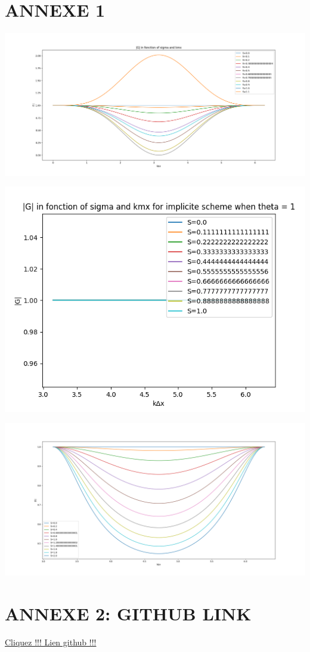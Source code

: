 \documentclass[12pt]{article}
\begin{document}





\newpage

\section{ANNEXE 1}





\vfill
\includegraphics[width=1\textwidth]{sigma_question d.png}
\vfill

\vfill
\includegraphics[width=1\textwidth]{sigma_f_1.png}
\vfill

\vfill
\includegraphics[width=1\textwidth]{sigma_f_05.png}
\vfill

\section{ANNEXE 2: GITHUB LINK}

\href{https://github.com/Kenesis69/MEC_6602E_HOMEWORK_1}{Cliquez !!! Lien github !!!}
\end{document}
